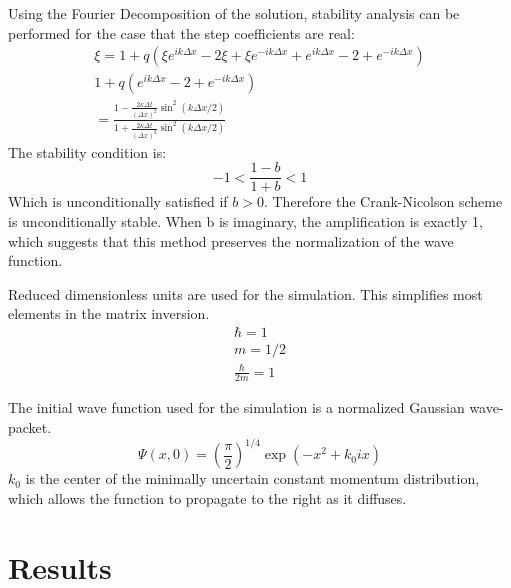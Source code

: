 \documentclass[twoside,twocolumn]{article}
\newcommand{\dx}{\Delta x}
\newcommand{\dt}{\Delta t}
\begin{document}
Using the Fourier Decomposition of the solution, stability analysis can be performed for the case that the step coefficients are real:
\small
	\begin{gather*}
		\xi = 1 + q(\xi e^{ik\dx} - 2\xi + \xi e^{-ik\dx} + e^{ik\dx}
	- 2 + e^{-ik\dx}) \\
	1 + q(e^{ik\dx} - 2 + e^{-ik\dx})\\
	 = \frac{1 - \frac{2\kappa \dt}{(\dx)^2}\sin^2(k\dx /2)}
	{1 + \frac{2\kappa \dt}{(\dx)^2}\sin^2(k\dx /2)}
\end{gather*}
\normalsize
The stability condition is:
\begin{equation}
	-1 < \frac{1 - b}{1 + b} < 1
\end{equation}
Which is unconditionally satisfied if $b > 0$. Therefore the Crank-Nicolson scheme is unconditionally stable. When b is imaginary, the amplification is exactly 1, which suggests that this method preserves the normalization of the wave function. 


Reduced dimensionless units are used for the simulation. This simplifies most elements in the matrix inversion.
\begin{equation}
	\begin{split}
		\hbar = 1 \\
		m = 1/2 \\
		\frac{\hbar}{2m} = 1
	\end{split}
\end{equation}

The initial wave function used for the simulation is a normalized Gaussian wave-packet.
\begin{equation}
	\Psi(x,0) = \left(\frac{\pi}{2}\right)^{1/4} \exp(-x^2 + k_0 ix)
\end{equation}
$k_0$ is the center of the minimally uncertain constant momentum distribution, which allows the function to propagate to the right as it diffuses.
\\
\section{Results}
\end{document}
